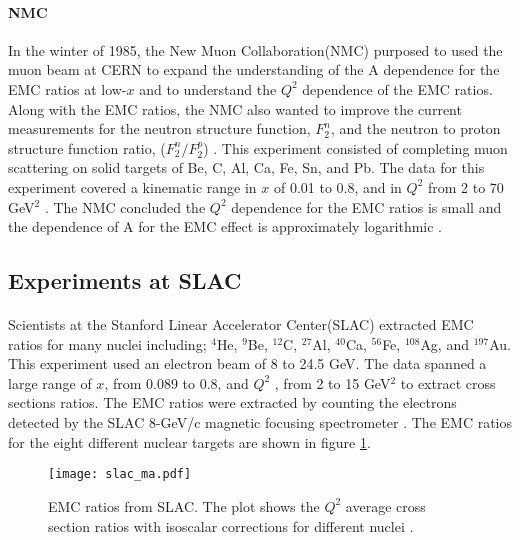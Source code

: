 \paragraph{NMC}In the winter of 1985, the New Muon Collaboration(NMC) purposed to used the muon beam at CERN to expand the understanding of the A dependence for the EMC ratios at low-$x$ and to understand the $Q^2$ dependence of the EMC ratios. Along with the EMC ratios, the NMC also wanted to improve the current measurements for the neutron structure function, $F_2^n$, and the neutron to proton structure function ratio, ($F_2^n/F_2^p$) \cite{NMCtech}. This experiment consisted of completing muon scattering on solid targets of Be, C, Al, Ca, Fe, Sn, and Pb. The data for this experiment covered a kinematic range in $x$ of 0.01 to 0.8, and in $Q^2$ from 2 to 70 GeV$^2$ \cite{ref:NMC}. The NMC concluded the $Q^2$ dependence for the EMC ratios is small and the dependence of A for the EMC effect is approximately logarithmic \cite{ref:NMC,Ajth}. 

\subsection{Experiments at SLAC}
\paragraph{}Scientists at the Stanford Linear Accelerator Center(SLAC) extracted EMC ratios for many nuclei including; $^4$He, $^9$Be, $^{12}$C, $^{27}$Al, $^{40}$Ca, $^{56}$Fe, $^{108}$Ag, and $^{197}$Au. This experiment used an electron beam of 8 to 24.5 GeV. The data spanned a large range of $x$, from 0.089 to 0.8, and $Q^2$ , from 2 to 15 GeV$^2$ to extract cross sections ratios. The EMC ratios were extracted by counting the electrons detected by the SLAC 8-GeV/c magnetic focusing spectrometer \cite{gomez}. The EMC ratios for the eight different nuclear targets are shown in figure \ref{gomez_ma}.
\begin{figure}[]
	\centering
		\texttt{[image: slac\_ma.pdf]} 
		\caption{EMC ratios from SLAC. The plot shows the $Q^2$ average cross section ratios with isoscalar corrections for different nuclei \cite{gomez}.}
		\label{gomez_ma}
\end{figure} 
